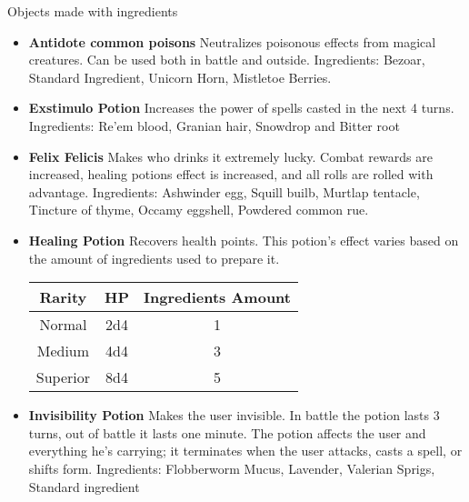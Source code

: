 Objects made with ingredients\\

\begin{itemize}
    \item \textbf{Antidote common poisons}
 Neutralizes poisonous effects from magical creatures. Can be used both in battle and outside.
 Ingredients: Bezoar, Standard Ingredient, Unicorn Horn, Mistletoe Berries.
    
    \item \textbf{Exstimulo Potion}
Increases the power of spells casted in the next 4 turns.
Ingredients: Re'em blood, Granian hair, Snowdrop and Bitter root

    \item \textbf{Felix Felicis}
Makes who drinks it extremely lucky. Combat rewards are increased, healing potions effect is increased, and all rolls are rolled with advantage.
Ingredients: Ashwinder egg, Squill builb, Murtlap tentacle, Tincture of thyme, Occamy eggshell, Powdered common rue.
    
	\item \textbf{Healing Potion}
 Recovers health points. This potion's effect varies based on the amount of ingredients used to prepare it. %

\begin{tabular}{ |c|c|c } 
\hline
\textbf{Rarity} & \textbf{HP}  & \textbf{Ingredients Amount} \\
\hline
Normal  & 2d4  & 1  \\
\hline
Medium  & 4d4 & 3 \\
\hline
Superior  & 8d4 & 5 \\
\hline
\end{tabular}


	 \item \textbf{Invisibility Potion}
Makes the user invisible. In battle the potion lasts 3 turns, out of battle it lasts one minute. The potion affects the user and everything he's carrying; it terminates when the user attacks, casts a spell, or shifts form.
Ingredients: Flobberworm Mucus, Lavender, Valerian Sprigs, Standard ingredient
\end{itemize}
\pagebreak